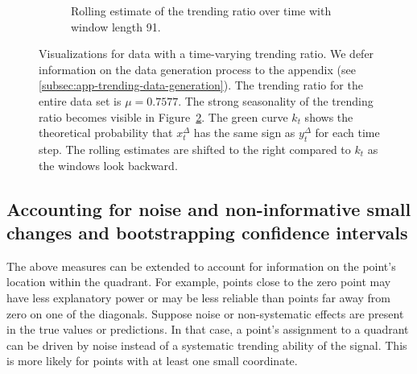 \documentclass[pdflatex]{sn-jnl}
\theoremstyle{plain}%
\theoremstyle{definition}
\newcommand{\diffxt}[1][t]{x^{\Delta}_{#1}}
\newcommand{\diffyt}[1][t]{y^{\Delta}_{#1}}
\begin{document}
\begin{figure}
\begin{subfigure}[t]{.48\textwidth}
    \caption{Rolling estimate of the trending ratio over time with window length 91. }\label{fig:trending_ratio_time_series}
    \end{subfigure}%
    \caption[Visualizations of the four-quadrant plot for data with a time-varying trending ratio.]{Visualizations for data with a time-varying trending ratio. We defer information on the data generation process to the appendix (see \ref{subsec:app-trending-data-generation}). The trending ratio for the entire data set is $\mu = 0.7577$. The strong seasonality of the trending ratio becomes visible in Figure~\ref{fig:trending_ratio_time_series}. The green curve $k_t$ shows the theoretical probability that $\diffxt$ has the same sign as $\diffyt$ for each time step. The rolling estimates are shifted to the right compared to $k_t$ as the windows look backward.}
\end{figure}

\subsection{Accounting for noise and non-informative small changes and bootstrapping confidence intervals}\label{subsec:trending-noise}

The above measures can be extended to account for information on the point's location within the quadrant.
For example, points close to the zero point may have less explanatory power or may be less reliable than points far away from zero on one of the diagonals.
Suppose noise or non-systematic effects are present in the true values or predictions.
In that case, a point's assignment to a quadrant can be driven by noise instead of a systematic trending ability of the signal.
This is more likely for points with at least one small coordinate.
\end{document}
